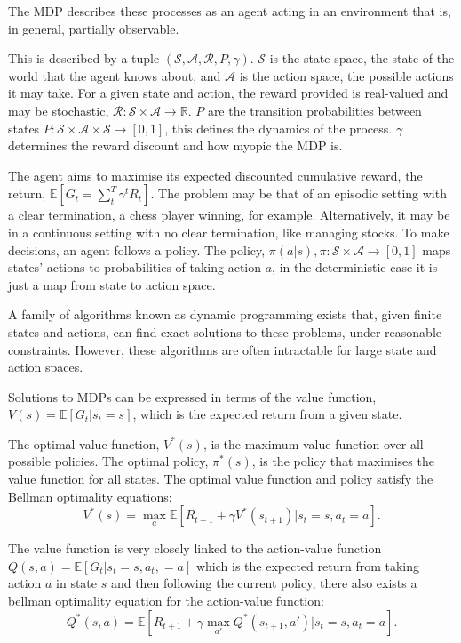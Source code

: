 The MDP describes these processes as an agent acting in an environment that is, in general, partially observable.

This is described by a tuple $(\mathcal{S}, \mathcal{A}, \mathcal{R}, P, \gamma)$. $\mathcal{S}$ is the state space, the state of the world that the agent knows about, and $\mathcal{A}$ is the action space, the possible actions it may take. For a given state and action, the reward provided is real-valued and may be stochastic, $\mathcal{R}: \mathcal{S} \times \mathcal{A} \rightarrow \mathbb{R}$. $P$ are the transition probabilities between states $P: \mathcal{S} \times \mathcal{A} \times \mathcal{S} \rightarrow [0, 1]$, this defines the dynamics of the process. $\gamma $ determines the reward discount and how myopic the MDP is.

The agent aims to maximise its expected discounted cumulative reward, the return, $ \mathbb{E} [ G_t = \sum_t^T \gamma^t R_t ] $. The problem may be that of an episodic setting with a clear termination, a chess player winning, for example. Alternatively, it may be in a continuous setting with no clear termination, like managing stocks. To make decisions, an agent follows a policy. The policy, $\pi(a|s), \pi: \mathcal{S} \times \mathcal{A} \rightarrow [0, 1]$ maps states' actions to probabilities of taking action $a$, in the deterministic case it is just a map from state to action space.


A family of algorithms known as dynamic programming exists that, given finite states and actions, can find exact solutions to these problems, under reasonable constraints. However, these algorithms are often intractable for large state and action spaces.

Solutions to MDPs can be expressed in terms of the value function, $V(s) = \mathbb{E} [ G_t | s_t = s]$, which is the expected return from a given state.

The optimal value function, $V^*(s)$, is the maximum value function over all possible policies. The optimal policy, $\pi^*(s)$, is the policy that maximises the value function for all states. The optimal value function and policy satisfy the Bellman optimality equations\cite{bellamn1957mdp}:
\begin{equation}
	V^*(s) = \max_a \mathbb{E} [ R_{t+1} + \gamma V^*(s_{t+1}) | s_t = s, a_t = a].
\end{equation}

The value function is very closely linked to the action-value function $Q(s, a) = \mathbb{E} [G_t | s_t=s, a_t,=a]$ which is the expected return from taking action $a$ in state $s$ and then following the current policy, there also exists a bellman optimality equation for the action-value function:
\begin{equation}
	Q^*(s,a) = \mathbb{E} [ R_{t+1} + \gamma \max_{a'} Q^*(s_{t+1}, a') | s_t = s, a_t = a].
\end{equation}

